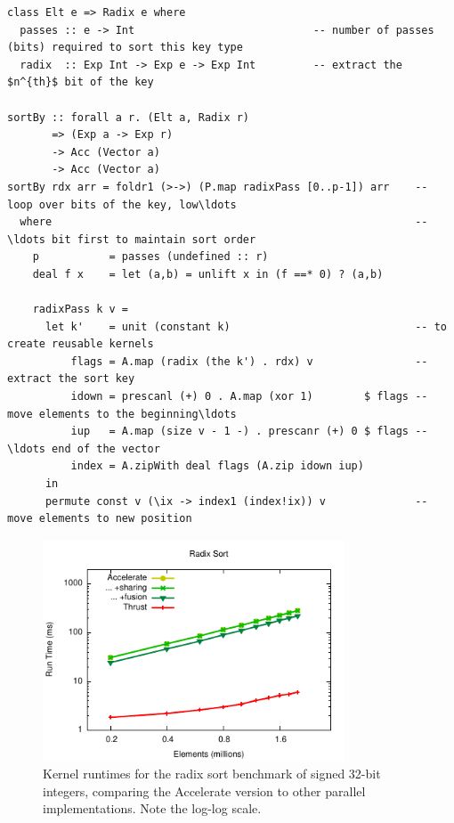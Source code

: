 \begin{lstlisting}[style=haskell_float
    ,label=lst:radixsort
    ,caption={Radix sort algorithm}]
class Elt e => Radix e where
  passes :: e -> Int                            -- number of passes (bits) required to sort this key type
  radix  :: Exp Int -> Exp e -> Exp Int         -- extract the $n^{th}$ bit of the key

sortBy :: forall a r. (Elt a, Radix r)
       => (Exp a -> Exp r)
       -> Acc (Vector a)
       -> Acc (Vector a)
sortBy rdx arr = foldr1 (>->) (P.map radixPass [0..p-1]) arr    -- loop over bits of the key, low\ldots
  where                                                         -- \ldots bit first to maintain sort order
    p           = passes (undefined :: r)
    deal f x    = let (a,b) = unlift x in (f ==* 0) ? (a,b)

    radixPass k v =
      let k'    = unit (constant k)                             -- to create reusable kernels
          flags = A.map (radix (the k') . rdx) v                -- extract the sort key
          idown = prescanl (+) 0 . A.map (xor 1)        $ flags -- move elements to the beginning\ldots
          iup   = A.map (size v - 1 -) . prescanr (+) 0 $ flags -- \ldots end of the vector
          index = A.zipWith deal flags (A.zip idown iup)
      in
      permute const v (\ix -> index1 (index!ix)) v              -- move elements to new position
\end{lstlisting}

\begin{figure}
    \begin{center}
        \includegraphics[width=0.8\textwidth]{images/results/radixsort/radixsort}
    \end{center}
    \caption[Radix sort kernel benchmarks]{Kernel runtimes for the radix sort benchmark
        of signed 32-bit integers, comparing the Accelerate version to other
        parallel implementations. Note the log-log scale.}
    \label{fig:radixsort}
\end{figure}

